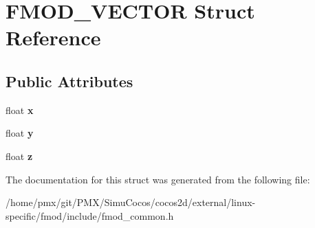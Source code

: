 \hypertarget{structFMOD__VECTOR}{}\section{F\+M\+O\+D\+\_\+\+V\+E\+C\+T\+OR Struct Reference}
\label{structFMOD__VECTOR}
\subsection*{Public Attributes}
\begin{DoxyCompactItemize}
\item 
\mbox{\label{structFMOD__VECTOR_afe9fad8ce812c3cfc021c25bbb8bc0e8}} 
float {\bfseries x}
\item 
\mbox{\label{structFMOD__VECTOR_abea7feb26ece298baa766f821b8686ff}} 
float {\bfseries y}
\item 
\mbox{\label{structFMOD__VECTOR_ab64088b1bd2e695bd1abc6b370b71796}} 
float {\bfseries z}
\end{DoxyCompactItemize}


The documentation for this struct was generated from the following file\+:\begin{DoxyCompactItemize}
\item 
/home/pmx/git/\+P\+M\+X/\+Simu\+Cocos/cocos2d/external/linux-\/specific/fmod/include/fmod\+\_\+common.\+h\end{DoxyCompactItemize}

